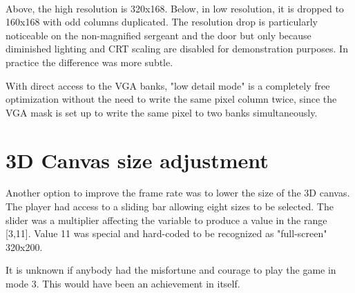 \vspace{-6pt}
\\
\par
Above, the high resolution is 320x168. Below, in low resolution, it is dropped to 160x168 with odd columns duplicated. The resolution drop is particularly noticeable on the non-magnified sergeant and the door but only because diminished lighting and CRT scaling are disabled for demonstration purposes. In practice the difference was more subtle.\\
\par
With direct access to the VGA banks, "low detail mode" is a completely free optimization without the need to write the same pixel column twice, since the VGA mask is set up to write the same pixel to two banks simultaneously.\\
\par
\vspace{-3pt}

\vspace{-30pt}
\section{3D Canvas size adjustment}
Another option to improve the frame rate was to lower the size of the 3D canvas. The player had access to a sliding bar allowing eight sizes to be selected. The slider was a multiplier affecting the variable  to produce a value in the range [3,11]. Value 11 was special and hard-coded to be recognized as "full-screen" 320x200.\\
\par
\vspace{4mm}
\par
It is unknown if anybody had the misfortune and courage to play the game in mode 3. This would have been an achievement in itself.\\
\par
{}
\par
{}

